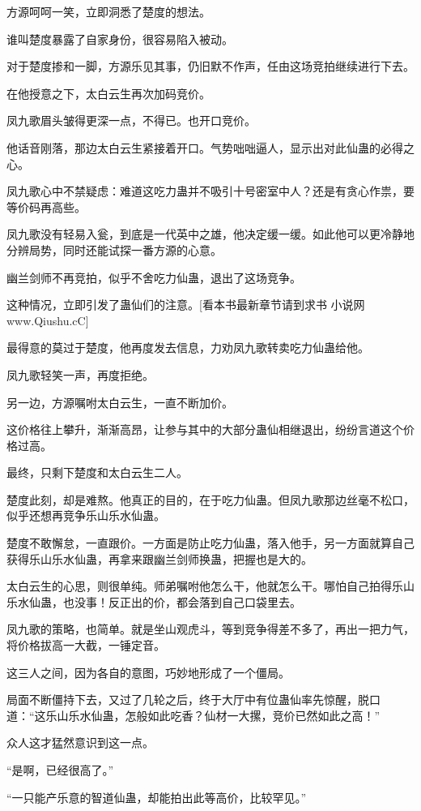 \begin{this_body}
方源呵呵一笑，立即洞悉了楚度的想法。

谁叫楚度暴露了自家身份，很容易陷入被动。

对于楚度掺和一脚，方源乐见其事，仍旧默不作声，任由这场竞拍继续进行下去。

在他授意之下，太白云生再次加码竞价。

凤九歌眉头皱得更深一点，不得已。也开口竞价。

他话音刚落，那边太白云生紧接着开口。气势咄咄逼人，显示出对此仙蛊的必得之心。

凤九歌心中不禁疑虑：难道这吃力蛊并不吸引十号密室中人？还是有贪心作祟，要等价码再高些。

凤九歌没有轻易入瓮，到底是一代英中之雄，他决定缓一缓。如此他可以更冷静地分辨局势，同时还能试探一番方源的心意。

幽兰剑师不再竞拍，似乎不舍吃力仙蛊，退出了这场竞争。

这种情况，立即引发了蛊仙们的注意。[看本书最新章节请到求书 小说网www.Qiushu.cC]

最得意的莫过于楚度，他再度发去信息，力劝凤九歌转卖吃力仙蛊给他。

凤九歌轻笑一声，再度拒绝。

另一边，方源嘱咐太白云生，一直不断加价。

这价格往上攀升，渐渐高昂，让参与其中的大部分蛊仙相继退出，纷纷言道这个价格过高。

最终，只剩下楚度和太白云生二人。

楚度此刻，却是难熬。他真正的目的，在于吃力仙蛊。但凤九歌那边丝毫不松口，似乎还想再竞争乐山乐水仙蛊。

楚度不敢懈怠，一直跟价。一方面是防止吃力仙蛊，落入他手，另一方面就算自己获得乐山乐水仙蛊，再拿来跟幽兰剑师换蛊，把握也是大的。

太白云生的心思，则很单纯。师弟嘱咐他怎么干，他就怎么干。哪怕自己拍得乐山乐水仙蛊，也没事！反正出的价，都会落到自己口袋里去。

凤九歌的策略，也简单。就是坐山观虎斗，等到竞争得差不多了，再出一把力气，将价格拔高一大截，一锤定音。

这三人之间，因为各自的意图，巧妙地形成了一个僵局。

局面不断僵持下去，又过了几轮之后，终于大厅中有位蛊仙率先惊醒，脱口道：“这乐山乐水仙蛊，怎般如此吃香？仙材一大摞，竞价已然如此之高！”

众人这才猛然意识到这一点。

“是啊，已经很高了。”

“一只能产乐意的智道仙蛊，却能拍出此等高价，比较罕见。”


\end{this_body}
